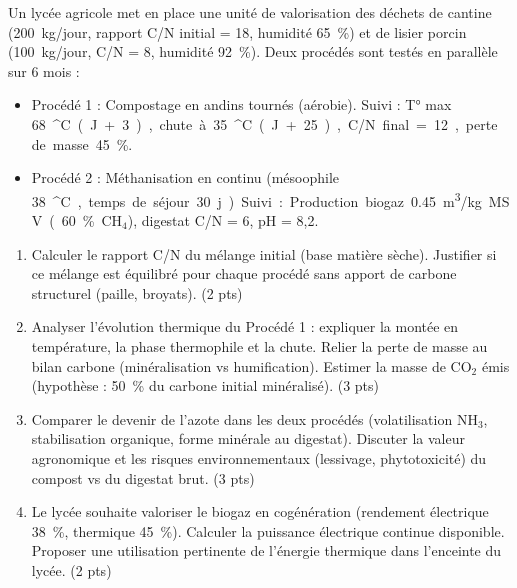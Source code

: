 \documentclass[11pt]{article}
\providecommand{\degree}{^{\circ}}
\begin{document}
\begin{exercice}
Un lycée agricole met en place une unité de valorisation des déchets de cantine (\SI{200}{kg/jour}, rapport C/N initial = 18, humidité \SI{65}{\%}) et de lisier porcin (\SI{100}{kg/jour}, C/N = 8, humidité \SI{92}{\%}). Deux procédés sont testés en parallèle sur 6 mois :
\begin{itemize}
    \item Procédé 1 : Compostage en andins tournés (aérobie). Suivi : T° max \SI{68}{\degree C} (J+3), chute à \SI{35}{\degree C} (J+25), C/N final = 12, perte de masse \SI{45}{\%}.
    \item Procédé 2 : Méthanisation en continu (mésoophile \SI{38}{\degree C}, temps de séjour \SI{30}{j}). Suivi : Production biogaz \SI{0,45}{m^3/kg MSV} (\SI{60}{\%} CH$_4$), digestat C/N = 6, pH = 8,2.
\end{itemize}
\begin{enumerate}
    \item Calculer le rapport C/N du mélange initial (base matière sèche). Justifier si ce mélange est équilibré pour chaque procédé sans apport de carbone structurel (paille, broyats). (2 pts)
    \item Analyser l'évolution thermique du Procédé 1 : expliquer la montée en température, la phase thermophile et la chute. Relier la perte de masse au bilan carbone (minéralisation vs humification). Estimer la masse de CO$_2$ émis (hypothèse : \SI{50}{\%} du carbone initial minéralisé). (3 pts)
    \item Comparer le devenir de l'azote dans les deux procédés (volatilisation NH$_3$, stabilisation organique, forme minérale au digestat). Discuter la valeur agronomique et les risques environnementaux (lessivage, phytotoxicité) du compost vs du digestat brut. (3 pts)
    \item Le lycée souhaite valoriser le biogaz en cogénération (rendement électrique \SI{38}{\%}, thermique \SI{45}{\%}). Calculer la puissance électrique continue disponible. Proposer une utilisation pertinente de l'énergie thermique dans l'enceinte du lycée. (2 pts)
\end{enumerate}
\end{exercice}
\end{document}

